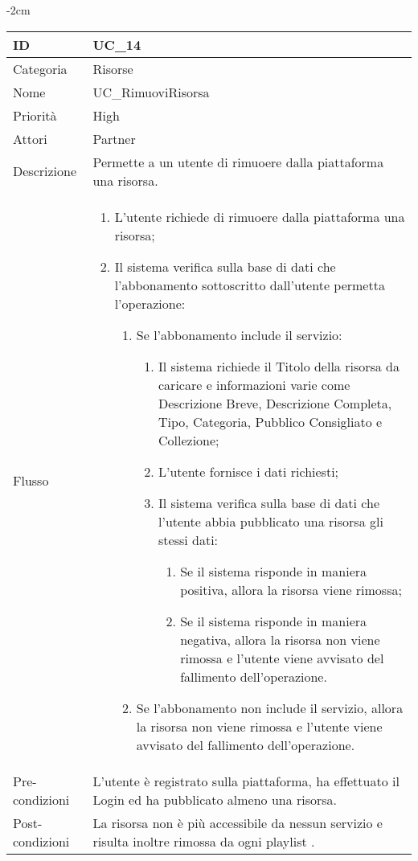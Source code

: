 \begin{center}
\begin{table}[bp]
    \centering
    \addtolength{\leftskip} {-2cm}
\begin{tabular}{ |p{2.6cm}|p{13cm}|  }
\hline
ID & UC\_14 \\\hline
Categoria & Risorse\\\hline
Nome & UC\_RimuoviRisorsa\\\hline
Priorità & High \\\hline
Attori &  Partner \\\hline
Descrizione & Permette a un utente di rimuoere dalla piattaforma una risorsa.\\\hline
Flusso &  	\begin{enumerate}
			\item L'utente richiede di rimuoere dalla piattaforma una risorsa;
			\item Il sistema verifica sulla base di dati che l'abbonamento sottoscritto dall'utente permetta l'operazione:
			\begin{enumerate}
				\item Se l'abbonamento include il servizio:
				\begin{enumerate}
					\item Il sistema richiede il Titolo della risorsa da caricare e informazioni varie come Descrizione Breve,  Descrizione Completa, Tipo, Categoria, Pubblico Consigliato e Collezione;
					\item L'utente fornisce i dati richiesti;
					\item Il sistema verifica sulla base di dati che l'utente abbia pubblicato una risorsa gli stessi dati:
					\begin{enumerate}
						\item Se il sistema risponde in maniera positiva, allora la risorsa viene rimossa;
						\item Se il sistema risponde in maniera negativa, allora  la risorsa non viene rimossa e l'utente viene avvisato del fallimento dell'operazione.
					\end{enumerate}
				\end{enumerate}
				\item Se l'abbonamento non include il servizio, allora la risorsa non viene rimossa e l'utente viene avvisato del fallimento dell'operazione.
			\end{enumerate}
		\end{enumerate}\\\hline
Pre-condizioni & L'utente è registrato sulla piattaforma, ha effettuato il Login ed ha pubblicato almeno una risorsa.\\\hline
Post-condizioni & La risorsa non è più accessibile da nessun servizio e risulta inoltre rimossa da ogni playlist .\\\hline
\end{tabular}
\label{table_use_case:14}\newline
\end{table}


\end{center}
